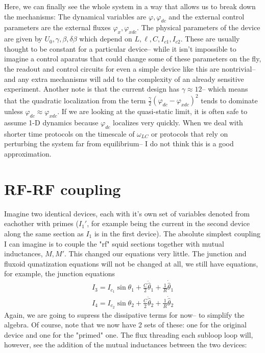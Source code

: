 \documentclass[paper=a4, twocolumn, fontsize=10pt]{article} %
\numberwithin{equation}{section} %
\numberwithin{figure}{section} %
\numberwithin{table}{section} %
\def \df#1{\hat{#1}}
\def \dl#1{#1}
\begin{document}
Here, we can finally see the whole system in a way that allows us to break down the mechanisms: The dynamical variables are $\dl\varphi, \dl\varphi_{dc}$ and the external control parameters are the external fluxes $\dl\varphi_x, \dl\varphi_{xdc}$. The physical parameters of the device are given by $U_0, \gamma, \beta, \delta\beta$ which depend on $L, \ell, C, I_{c1}, I_{c2}$. These are usually thought to be constant for a particular device-- while it isn't impossible to imagine a control aparatus that could change some of these parameters on the fly, the readout and control circuits for even a simple device like this are nontrivial-- and any extra mechanisms will add to the complexity of an already sensitive experiment. Another note is that the current design has $\gamma \approx 12$-- which means that the quadratic localization from the term $ \frac{\gamma}{2} (\varphi_{dc}-\varphi_{xdc})^2$ tends to dominate unless $\dl\varphi_{dc} \approx \dl\varphi_{xdc}$. If we are looking at the quasi-static limit, it is often safe to assume 1-D dynamics because  $\dl\varphi_{dc}$ localizes very quickly. When we deal with shorter time protocols on the timescale of $\omega_{LC}$ or protocols that rely on perturbing the system far from equilibrium-- I do not think this is a good approximation.



\section{ RF-RF coupling}

Imagine two identical devices, each with it's own set of variables denoted from eachother with primes ($I_1'$, for example being the current in the second device along the same section as $I_1$ is in the first device). The absolute simplest coupling I can imagine is to couple the "rf" squid sections together with mutual inductances, $M, M'$. This changed our equations very little. The junction and fluxoid qunatization equations will not be changed at all, we still have equations, for example, the junction equations
\begin{align}
    I_3 = I_{c_1} \sin \dl\theta_1 + \frac{C}{2} \ddot{\df \theta}_1 + \frac{1}{R} \dot{ \df \theta }_1
    \\ 
    I_4 = I_{c_2} \sin \dl\theta_2 + \frac{C}{2} \ddot{\df \theta}_2 + \frac{1}{R} \dot{ \df \theta}_2
    \end{align}
Again, we are going to supress the dissipative terms for now-- to simplify the algebra. Of course, note that we now have 2 sets of these: one for the original device and one for the "primed" one.  The flux threading each subloop loop will, however, see the addition of the mutual inductances between the two devices:
\end{document}
